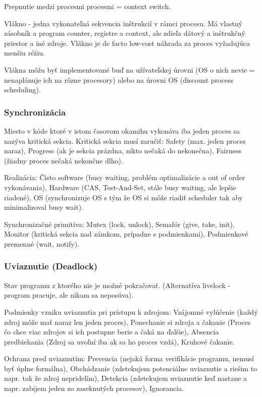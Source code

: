 \documentclass[a4paper,10pt]{article}
\begin{document}
\begin{multicols}{2}
	Prepnutie medzi procesmi procesmi = context switch.
	
	Vlákno - jedna vykonateľná sekvencia inštrukcií v rámci procesu. Má vlastný zásobník a program counter, registre a context, ale zdieľa dátový a inštrukčný priestor a iné zdroje. Vlákno je de facto low-cost náhrada za proces vyžadujúca menšiu réžiu.
	
	Vlákna môžu byť implementované buď na užívateľskej úrovni (OS o nich nevie = nenaplánuje ich na rôzne procesory) alebo na úrovni OS (discount process scheduling).
	
	\subsubsection{Synchronizácia}
	
		Miesto v kóde ktoré v istom časovom okamihu vykonáva iba jeden proces sa nazýva kritická sekcia. Kritická sekcia musí zaručiť: Safety (max. jeden proces naraz), Progress (ak je sekcia prázdna, nikto nečaká do nekonečna), Fairness (žiadny proces nečaká nekončne dlho).
		
		Realizácia: Čisto software (busy waiting, problém optimalizácie a out of order vykonávania), Hardware (CAS, Test-And-Set, stále busy waiting, ale lepšie riadené), OS (synchronizuje OS s tým že OS si môže riadiť scheduler tak aby minimalizoval busy wait).
		
		Synchronizačné primitíva: Mutex (lock, unlock), Semafór (give, take, init), Monitor (kritická sekcia nad zámkom, prípadne s podmienkami), Podmienkové premenné (wait, notify).
		
	\subsubsection{Uviaznutie (Deadlock)}
		
		Stav programu z ktorého nie je možné pokračovať. (Alternatíva livelock - program pracuje, ale nikam sa neposúva).
		
		Podmienky vzniku uviaznutia pri prístupu k zdrojom: Vzájomné vylúčenie (každý zdroj môže mať naraz len jeden proces), Ponechanie si zdroja a čakanie (Proces čo chce viac zdrojov si ich postupne berie a čaká na ďalšie), Absencia predbiehania (Zdroj sa uvoľní iba ak sa ho proces vzdá), Kruhové čakanie.
		
		Ochrana pred uviaznutím: Prevencia (nejaká forma verifikácie programu, nemusí byť úplne formálna), Obchádzanie (zdetekujem potenciálne uviaznutie a riešim to napr. tak že zdroj nepridelím), Detekcia (zdetekujem uviaznutie keď nastane a napr. zabijem jeden zo zaseknutých procesov), Ignorancia.
		

\end{multicols}
\end{document}
